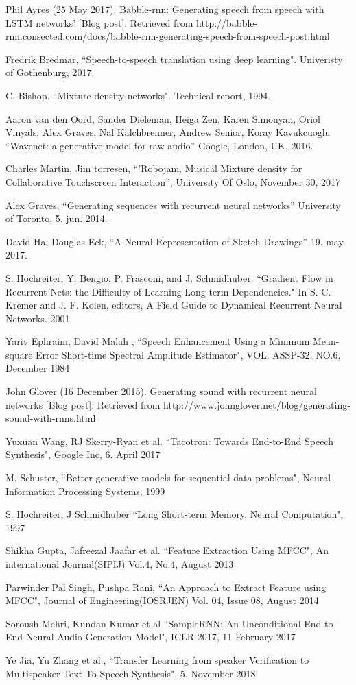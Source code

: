 \documentclass[conference]{IEEEtran}
\begin{document}
\begin{thebibliography}{00}
 Phil Ayres (25 May 2017). Babble-rnn: Generating speech from speech with LSTM networks' [Blog post]. Retrieved from http://babble-rnn.consected.com/docs/babble-rnn-generating-speech-from-speech-post.html

 Fredrik Bredmar, ``Speech-to-speech translation using deep learning". Univeristy of Gothenburg, 2017.

 C. Bishop. ``Mixture density networks". Technical report, 1994.

 Aäron van den Oord, Sander Dieleman, Heiga Zen, Karen Simonyan, Oriol Vinyals, Alex Graves, Nal Kalchbrenner, Andrew Senior, Koray Kavukcuoglu ``Wavenet: a generative model for raw audio'' Google, London, UK, 2016.

 Charles Martin, Jim torresen, ``'Robojam, Musical Mixture density for Collaborative Touchscreen Interaction'',
	University Of Oslo, November 30, 2017

 Alex Graves, ``Generating sequences with recurrent neural networks'' University of Toronto, 5. jun. 2014.

 David Ha, Douglas Eck, ``A Neural Representation of Sketch Drawings'' 19. may. 2017.

 S. Hochreiter, Y. Bengio, P. Frasconi, and J. Schmidhuber. ``Gradient Flow in Recurrent Nets: the Difficulty of Learning Long-term Dependencies." In S. C. Kremer and J. F. Kolen, editors, A Field Guide to Dynamical Recurrent Neural Networks. 2001.

 Yariv Ephraim, David Malah , ``Speech Enhancement Using a Minimum Mean-square Error Short-time Spectral Amplitude Estimator", VOL. ASSP-32, NO.6, December 1984

 John Glover (16 December 2015). Generating sound with recurrent neural networks [Blog post]. Retrieved from http://www.johnglover.net/blog/generating-sound-with-rnns.html

 Yuxuan Wang, RJ Skerry-Ryan et al. ``Tacotron: Towards End-to-End Speech Synthesis", Google Inc, 6. April 2017  

 M. Schuster, ``Better generative models for sequential data problems", Neural Information Processing Systems, 1999

 S. Hochreiter, J Schmidhuber ``Long Short-term Memory, Neural Computation", 1997

 Shikha Gupta, Jafreezal Jaafar et al. ``Feature Extraction Using MFCC", An international Journal(SIPIJ) Vol.4, No.4, August 2013

 Parwinder Pal Singh, Pushpa Rani, ``An Approach to Extract Feature using MFCC", Journal of Engineering(IOSRJEN) Vol. 04, Issue 08, August 2014

 Soroush Mehri, Kundan Kumar et al ``SampleRNN: An Unconditional End-to-End Neural Audio Generation Model", ICLR 2017, 11 February 2017

 Ye Jia, Yu Zhang et al., ``Transfer Learning from speaker Verification to Multispeaker Text-To-Speech Synthesis", 5. November 2018
\end{thebibliography}
\end{document}
